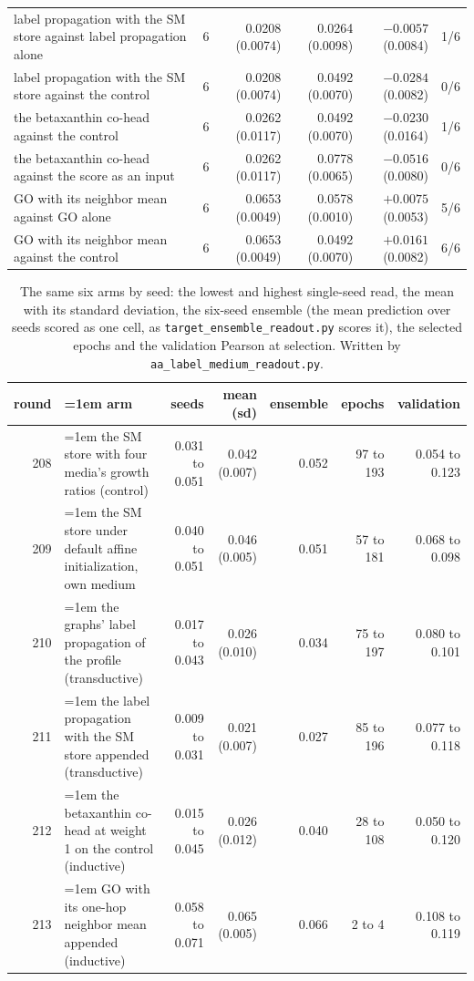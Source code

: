 \begin{table}[H]
\begin{tabular}{@{}lrrrrr@{}}
    label propagation with the SM store against label propagation alone & 6 & 0.0208 (0.0074) & 0.0264 (0.0098) & $-0.0057$ (0.0084) & 1/6 \\
    label propagation with the SM store against the control & 6 & 0.0208 (0.0074) & 0.0492 (0.0070) & $-0.0284$ (0.0082) & 0/6 \\
    the betaxanthin co-head against the control & 6 & 0.0262 (0.0117) & 0.0492 (0.0070) & $-0.0230$ (0.0164) & 1/6 \\
    the betaxanthin co-head against the score as an input & 6 & 0.0262 (0.0117) & 0.0778 (0.0065) & $-0.0516$ (0.0080) & 0/6 \\
    GO with its neighbor mean against GO alone & 6 & 0.0653 (0.0049) & 0.0578 (0.0010) & $+0.0075$ (0.0053) & 5/6 \\
    GO with its neighbor mean against the control & 6 & 0.0653 (0.0049) & 0.0492 (0.0070) & $+0.0161$ (0.0082) & 6/6 \\
    \hline
  \end{tabular}
\end{table}

\begin{table}[H]
  \centering
  \footnotesize
  \setlength{\tabcolsep}{2.5pt}
  \caption[Rounds 208 to 213: seed levels and ensembles]{The same six arms by seed: the lowest and highest single-seed read, the mean with its standard deviation, the six-seed ensemble (the mean prediction over seeds scored as one cell, as \texttt{target\_ensemble\_readout.py} scores it), the selected epochs and the validation Pearson at selection. Written by \texttt{aa\_label\_medium\_readout.py}.}
  \label{tab:aa-label-medium-levels}
  \begin{tabular}{@{}r>{\raggedright\hangindent=1em\hangafter=1\arraybackslash}p{84.5mm}rrrrr@{}}
    \hline
    round & arm & seeds & mean (sd) & ensemble & epochs & validation \\
    \hline
    208 & the SM store with four media's growth ratios (control) & 0.031 to 0.051 & 0.042 (0.007) & 0.052 & 97 to 193 & 0.054 to 0.123 \\
    209 & the SM store under default affine initialization, own medium & 0.040 to 0.051 & 0.046 (0.005) & 0.051 & 57 to 181 & 0.068 to 0.098 \\
    210 & the graphs' label propagation of the profile (transductive) & 0.017 to 0.043 & 0.026 (0.010) & 0.034 & 75 to 197 & 0.080 to 0.101 \\
    211 & the label propagation with the SM store appended (transductive) & 0.009 to 0.031 & 0.021 (0.007) & 0.027 & 85 to 196 & 0.077 to 0.118 \\
    212 & the betaxanthin co-head at weight 1 on the control (inductive) & 0.015 to 0.045 & 0.026 (0.012) & 0.040 & 28 to 108 & 0.050 to 0.120 \\
    213 & GO with its one-hop neighbor mean appended (inductive) & 0.058 to 0.071 & 0.065 (0.005) & 0.066 & 2 to 4 & 0.108 to 0.119 \\
    \hline
  \end{tabular}
\end{table}
